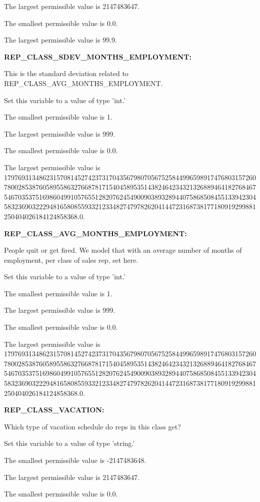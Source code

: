 The largest permissible value is 2147483647.

The smallest permissible value is 0.0.

The largest permissible value is 99.9.


\textbf{REP\_CLASS\_SDEV\_MONTHS\_EMPLOYMENT:}


This is the standard deviation related to REP\_CLASS\_AVG\_MONTHS\_EMPLOYMENT.

Set this variable to a value of type 'int.'

The smallest permissible value is 1.

The largest permissible value is 999.

The smallest permissible value is 0.0.

The largest permissible value is 179769313486231570814527423731704356798070567525844996598917476803157260780028538760589558632766878171540458953514382464234321326889464182768467546703537516986049910576551282076245490090389328944075868508455133942304583236903222948165808559332123348274797826204144723168738177180919299881250404026184124858368.0.


\textbf{REP\_CLASS\_AVG\_MONTHS\_EMPLOYMENT:}


People quit or get fired.  We model that with an average number of months of employment, per class of sales rep, set here.

Set this variable to a value of type 'int.'

The smallest permissible value is 1.

The largest permissible value is 999.

The smallest permissible value is 0.0.

The largest permissible value is 179769313486231570814527423731704356798070567525844996598917476803157260780028538760589558632766878171540458953514382464234321326889464182768467546703537516986049910576551282076245490090389328944075868508455133942304583236903222948165808559332123348274797826204144723168738177180919299881250404026184124858368.0.


\textbf{REP\_CLASS\_VACATION:}


Which type of vacation schedule do reps in this class get?

Set this variable to a value of type 'string.'

The smallest permissible value is -2147483648.

The largest permissible value is 2147483647.

The smallest permissible value is 0.0.

